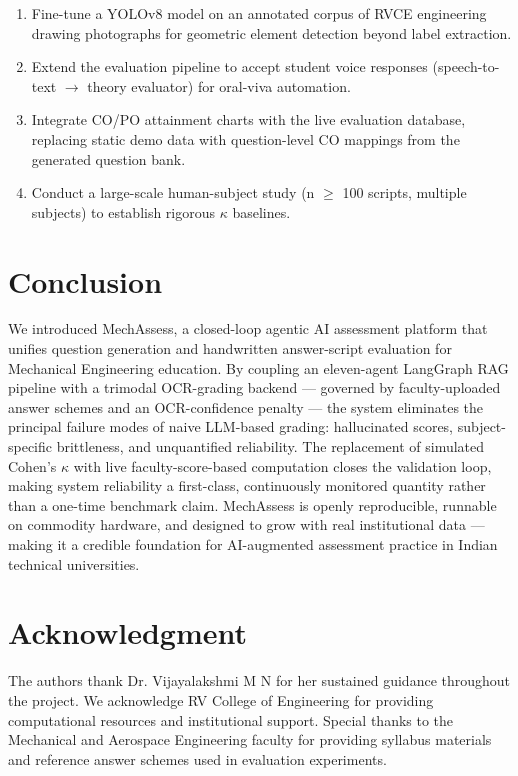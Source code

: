 \documentclass[conference]{IEEEtran}
\begin{document}
\begin{enumerate}
    \item Fine-tune a YOLOv8 model on an annotated corpus of RVCE engineering drawing photographs for geometric element detection beyond label extraction.
    \item Extend the evaluation pipeline to accept student voice responses (speech-to-text $\rightarrow$ theory evaluator) for oral-viva automation.
    \item Integrate CO/PO attainment charts with the live evaluation database, replacing static demo data with question-level CO mappings from the generated question bank.
    \item Conduct a large-scale human-subject study (n $\geq$ 100 scripts, multiple subjects) to establish rigorous $\kappa$ baselines.
\end{enumerate}

\section{Conclusion}
\label{sec:conclusion}

We introduced MechAssess, a closed-loop agentic AI assessment platform that unifies question generation and handwritten answer-script evaluation for Mechanical Engineering education. By coupling an eleven-agent LangGraph RAG pipeline with a trimodal OCR-grading backend — governed by faculty-uploaded answer schemes and an OCR-confidence penalty — the system eliminates the principal failure modes of naive LLM-based grading: hallucinated scores, subject-specific brittleness, and unquantified reliability. The replacement of simulated Cohen's $\kappa$ with live faculty-score-based computation closes the validation loop, making system reliability a first-class, continuously monitored quantity rather than a one-time benchmark claim. MechAssess is openly reproducible, runnable on commodity hardware, and designed to grow with real institutional data — making it a credible foundation for AI-augmented assessment practice in Indian technical universities.

\section*{Acknowledgment}
The authors thank Dr. Vijayalakshmi M N for her sustained guidance throughout the project. We acknowledge RV College of Engineering for providing computational resources and institutional support. Special thanks to the Mechanical and Aerospace Engineering faculty for providing syllabus materials and reference answer schemes used in evaluation experiments.
\end{document}
